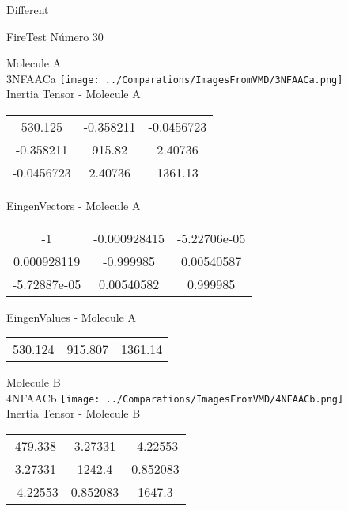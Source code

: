 \begin{center}
\vtab
\vtab
\textcolor{NavyBlue}{\Large Different}
\end{center}

 \newpage

\vtab[-2cm]
\begin{center}
{\large FireTest \tab Número 30}
\end{center}
\begin{multicols}{2}
\begin{center}

Molecule A \\ 
3NFAACa
\texttt{[image: ../Comparations/ImagesFromVMD/3NFAACa.png]}
\\
Inertia Tensor - Molecule A \\
\vtab

\begin{tabular}{|c c c|}
530.125	 & 	-0.358211	 & 	-0.0456723	 \\
-0.358211	 & 	915.82	 & 	2.40736	 \\
-0.0456723	 & 	2.40736	 & 	1361.13
\end{tabular}

\vtab
 EingenVectors - Molecule A     \\
\vtab
\begin{tabular}{|c c c|}
-1	 & 	-0.000928415	 & 	-5.22706e-05	 \\
0.000928119	 & 	-0.999985	 & 	0.00540587	 \\
-5.72887e-05	 & 	0.00540582	 & 	0.999985
\end{tabular}

\vtab
 EingenValues - Molecule A     \\
\vtab
\begin{tabular}{|c c c|}
530.124	 & 	915.807	 & 	1361.14	 \\
\end{tabular}
\columnbreak

Molecule B \\ 
4NFAACb
\texttt{[image: ../Comparations/ImagesFromVMD/4NFAACb.png]}
\\
Inertia Tensor - Molecule B \\
\vtab

\begin{tabular}{|c c c|}
479.338	 & 	3.27331	 & 	-4.22553	 \\
3.27331	 & 	1242.4	 & 	0.852083	 \\
-4.22553	 & 	0.852083	 & 	1647.3
\end{tabular}


\end{center}
\end{multicols}
